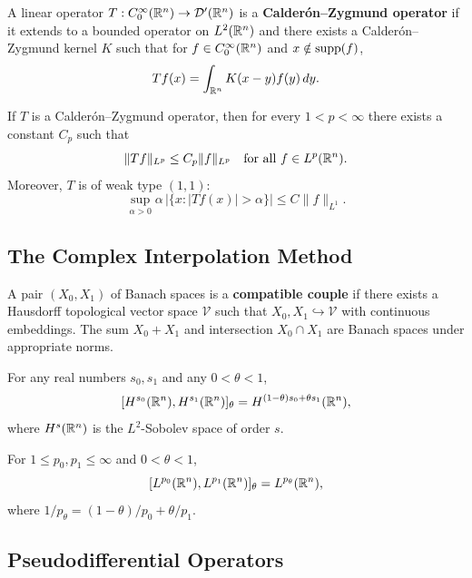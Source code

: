 \begin{definition}
A linear operator $T: C_0^\infty(\mathbb{R}^n) \to \mathcal{D}'(\mathbb{R}^n)$ is a \textbf{Calder\'{o}n--Zygmund operator} if it extends to a bounded operator on $L^2(\mathbb{R}^n)$ and there exists a Calder\'{o}n--Zygmund kernel $K$ such that for $f \in C_0^\infty(\mathbb{R}^n)$ and $x \notin \operatorname{supp}(f)$,
\[
Tf(x) = \int_{\mathbb{R}^n} K(x-y) f(y) \,dy.
\]
\end{definition}

\begin{theorem}[$L^p$ Boundedness]
If $T$ is a Calder\'{o}n--Zygmund operator, then for every $1 < p < \infty$ there exists a constant $C_p$ such that
\[
\|Tf\|_{L^p} \leq C_p \|f\|_{L^p} \quad \text{for all } f \in L^p(\mathbb{R}^n).
\]
Moreover, $T$ is of weak type $(1,1)$:
\[
\sup_{\alpha > 0} \alpha \, |\{x : |Tf(x)| > \alpha\}| \leq C \|f\|_{L^1}.
\]
\end{theorem}

\subsection{The Complex Interpolation Method}

\begin{definition}
A pair $(X_0, X_1)$ of Banach spaces is a \textbf{compatible couple} if there exists a Hausdorff topological vector space $\mathcal{V}$ such that $X_0, X_1 \hookrightarrow \mathcal{V}$ with continuous embeddings. The sum $X_0 + X_1$ and intersection $X_0 \cap X_1$ are Banach spaces under appropriate norms.
\end{definition}

\begin{theorem}
For any real numbers $s_0, s_1$ and any $0 < \theta < 1$,
\[
[H^{s_0}(\mathbb{R}^n), H^{s_1}(\mathbb{R}^n)]_\theta = H^{(1-\theta)s_0 + \theta s_1}(\mathbb{R}^n),
\]
where $H^s(\mathbb{R}^n)$ is the $L^2$-Sobolev space of order $s$.
\end{theorem}

\begin{theorem}
For $1 \leq p_0, p_1 \leq \infty$ and $0 < \theta < 1$,
\[
[L^{p_0}(\mathbb{R}^n), L^{p_1}(\mathbb{R}^n)]_\theta = L^{p_\theta}(\mathbb{R}^n),
\]
where $1/p_\theta = (1-\theta)/p_0 + \theta/p_1$.
\end{theorem}

\subsection{Pseudodifferential Operators}

